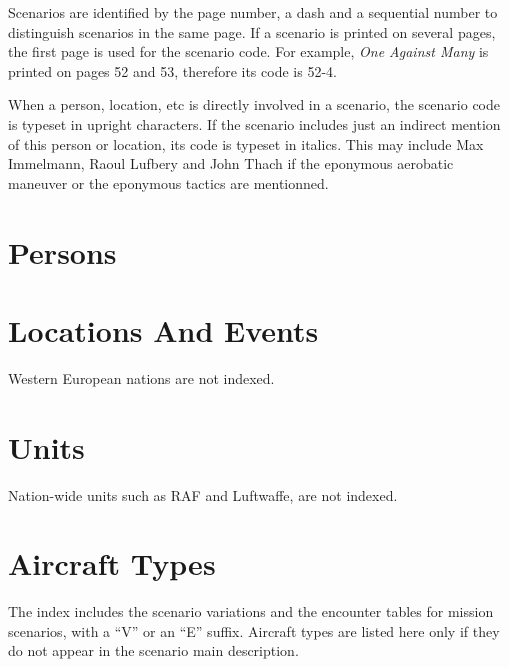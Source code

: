 \documentclass[a4paper,twocolumn]{article}
\begin{document}
Scenarios are identified by the page number, a dash and a
sequential number to distinguish scenarios in the same page. If
a scenario is printed on several pages, the first page is used for
the scenario code. For example, \textit{One Against Many} is printed
on pages 52 and 53, therefore its code is 52-4.

When a person, location, etc is directly involved in a scenario,
the scenario code is typeset in upright characters. If the scenario
includes just an indirect mention of this person or location,
its code is typeset in italics. This may include Max Immelmann, Raoul Lufbery
and John Thach if the eponymous aerobatic maneuver or the eponymous
tactics are mentionned.


\section*{Persons}

\vspace{1mm}


\section*{Locations And Events}

Western European nations are not indexed.

\vspace{1mm}


\section*{Units}

Nation-wide units such as RAF and Luftwaffe, are not indexed.

\vspace{1mm}


\vspace{1mm}

\section*{Aircraft Types}

The index includes the scenario variations and the encounter
tables for mission scenarios, with a ``V'' or an ``E''
suffix. Aircraft types are listed here only if they do not appear in the
scenario main description.
\end{document}
